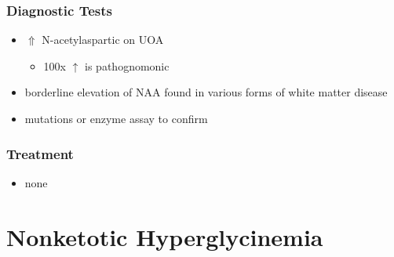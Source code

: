 \documentclass{scrartcl}
\begin{document}
\subsubsection{Diagnostic Tests}
\label{sec:org1c5b402}
\begin{itemize}
\item \(\Uparrow\) N-acetylaspartic on UOA
\begin{itemize}
\item 100x \(\uparrow\) is pathognomonic
\end{itemize}
\item borderline elevation of NAA found in various forms of white matter
disease
\item mutations or enzyme assay to confirm
\end{itemize}

\subsubsection{Treatment}
\label{sec:orgde0961d}
\begin{itemize}
\item none
\end{itemize}

\section{Nonketotic Hyperglycinemia}
\label{sec:org345fc93}
\end{document}
